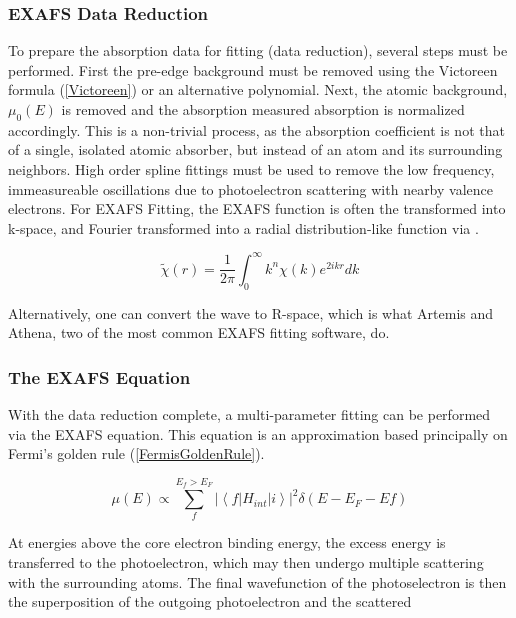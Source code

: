 \subsubsection{EXAFS Data Reduction}
To prepare the absorption data for fitting (data reduction), several steps must be performed. First the pre-edge background must be removed using the Victoreen formula (\ref{Victoreen}) or an alternative polynomial. Next, the atomic background, $ \mu_0(E) $  is removed and the absorption measured absorption is normalized accordingly. This is a non-trivial process, as the absorption coefficient is not that of a single, isolated atomic absorber, but instead of an atom and its surrounding neighbors. High order spline fittings must be used to remove the low frequency, immeasureable oscillations due to photoelectron scattering with nearby valence electrons. For EXAFS Fitting, the EXAFS function is often the transformed into k-space, and Fourier transformed into a radial distribution-like function via \cite{exafsbook}.

\begin{equation}
    \label{rdf-exafs}
    \widetilde{\chi}(r) = \frac{1}{2\pi} \int_{0}^{\infty }  k^n \chi(k) e^{2ikr} dk
\end{equation}

Alternatively, one can convert the wave to R-space, which is what Artemis and Athena, two of the most common EXAFS fitting software, do.

\subsubsection{The EXAFS Equation}
With the data reduction complete, a multi-parameter fitting can be performed via the EXAFS equation. This equation is an approximation based principally on Fermi's golden rule (\ref{FermisGoldenRule}).

\begin{equation}
    \label{FermisGoldenRule}
    \mu(E) \varpropto \sum_{f}^{E_f > E_F} \left\lvert \left\langle f \lvert H_{int} \rvert i \right\rangle \right\rvert ^2 \delta (E - E_F - Ef)  
\end{equation}

At energies above the core electron binding energy, the excess energy is transferred to the photoelectron, which may then undergo multiple scattering with the surrounding atoms. The final wavefunction of the photoselectron is then the superposition of the outgoing photoelectron and the scattered 

